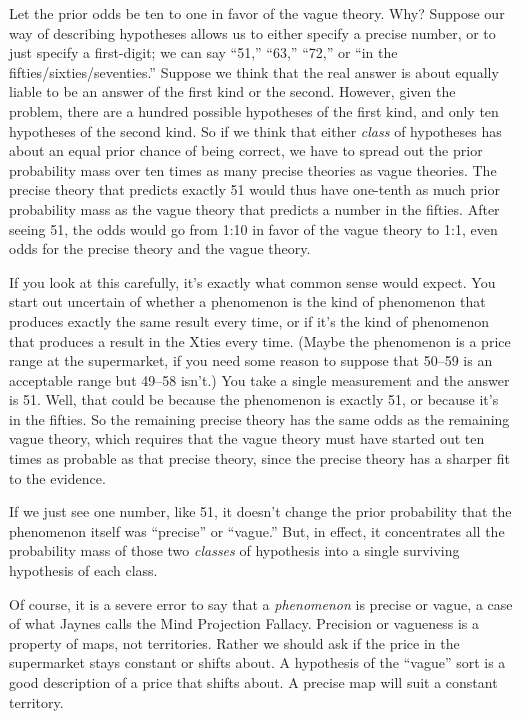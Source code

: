 {
 Let the prior odds be ten to one in favor of the vague theory.
Why? Suppose our way of describing hypotheses allows us to either
specify a precise number, or to just specify a first-digit; we can say
``51,''
``63,''
``72,'' or ``in the
fifties/sixties/seventies.'' Suppose we think that
the real answer is about equally liable to be an answer of the first
kind or the second. However, given the problem, there are a hundred
possible hypotheses of the first kind, and only ten hypotheses of the
second kind. So if we think that either \textit{class} of hypotheses
has about an equal prior chance of being correct, we have to spread out
the prior probability mass over ten times as many precise theories as
vague theories. The precise theory that predicts exactly 51 would thus
have one-tenth as much prior probability mass as the vague theory that
predicts a number in the fifties. After seeing 51, the odds would go
from 1:10 in favor of the vague theory to 1:1, even odds for the
precise theory and the vague theory.}

{
 If you look at this carefully, it's exactly what
common sense would expect. You start out uncertain of whether a
phenomenon is the kind of phenomenon that produces exactly the same
result every time, or if it's the kind of phenomenon
that produces a result in the Xties every time. (Maybe the phenomenon
is a price range at the supermarket, if you need some reason to suppose
that 50--59 is an acceptable range but 49--58 isn't.)
You take a single measurement and the answer is 51. Well, that could be
because the phenomenon is exactly 51, or because it's
in the fifties. So the remaining precise theory has the same odds as
the remaining vague theory, which requires that the vague theory must
have started out ten times as probable as that precise theory, since
the precise theory has a sharper fit to the evidence.}

{
 If we just see one number, like 51, it doesn't
change the prior probability that the phenomenon itself was
``precise'' or
``vague.'' But, in effect, it
concentrates all the probability mass of those two \textit{classes} of
hypothesis into a single surviving hypothesis of each class.}

{
 Of course, it is a severe error to say that a \textit{phenomenon}
is precise or vague, a case of what Jaynes calls the Mind Projection
Fallacy. Precision or vagueness is a property of
maps, not territories. Rather we should ask if the price in the
supermarket stays constant or shifts about. A hypothesis of the
``vague'' sort is a good description
of a price that shifts about. A precise map will suit a constant
territory.}


